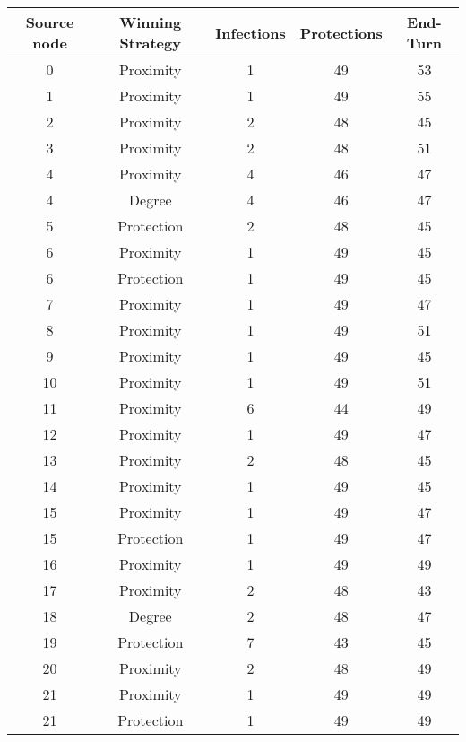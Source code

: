 \documentclass[results.tex]{subfiles}
\begin{document}
\begin{center}
  \begin{tabular}{| c || c | c | c | c |}
    \hline
    {\bfseries Source node} & {\bfseries Winning Strategy} & {\bfseries Infections} & {\bfseries Protections} & {\bfseries End-Turn} \\  %
    \hline\hline
    0 & Proximity & 1 & 49 & 53 \\ 
    \hline
    1 & Proximity & 1 & 49 & 55 \\ 
    \hline
    2 & Proximity & 2 & 48 & 45 \\ 
    \hline
    3 & Proximity & 2 & 48 & 51 \\ 
    \hline
    4 & Proximity & 4 & 46 & 47 \\ 
    \hline
    4 & Degree & 4 & 46 & 47 \\ 
    \hline
    5 & Protection & 2 & 48 & 45 \\ 
    \hline
    6 & Proximity & 1 & 49 & 45 \\ 
    \hline
    6 & Protection & 1 & 49 & 45 \\ 
    \hline
    7 & Proximity & 1 & 49 & 47 \\ 
    \hline
    8 & Proximity & 1 & 49 & 51 \\ 
    \hline
    9 & Proximity & 1 & 49 & 45 \\ 
    \hline
    10 & Proximity & 1 & 49 & 51 \\ 
    \hline
    11 & Proximity & 6 & 44 & 49 \\ 
    \hline
    12 & Proximity & 1 & 49 & 47 \\ 
    \hline
    13 & Proximity & 2 & 48 & 45 \\ 
    \hline
    14 & Proximity & 1 & 49 & 45 \\ 
    \hline
    15 & Proximity & 1 & 49 & 47 \\ 
    \hline
    15 & Protection & 1 & 49 & 47 \\ 
    \hline
    16 & Proximity & 1 & 49 & 49 \\ 
    \hline
    17 & Proximity & 2 & 48 & 43 \\ 
    \hline
    18 & Degree & 2 & 48 & 47 \\ 
    \hline
    19 & Protection & 7 & 43 & 45 \\ 
    \hline
    20 & Proximity & 2 & 48 & 49 \\ 
    \hline
    21 & Proximity & 1 & 49 & 49 \\ 
    \hline
    21 & Protection & 1 & 49 & 49 \\ 

\end{tabular}
\end{center}
\end{document}

